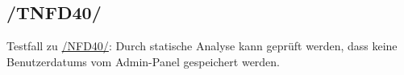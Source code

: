 \subsection*{/TNFD40/}
\label{/TNFD40/} Testfall zu \hyperref[/NFD40/]{/NFD40/}: Durch \gls{statische Analyse} kann geprüft werden, dass keine \Glspl{Benutzerdatum} vom \Gls{Admin-Panel} gespeichert werden.